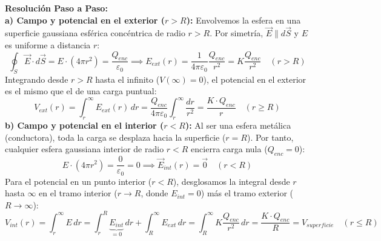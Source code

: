 \begin{ejercicio}
\begin{center}
\end{center}
\textbf{Resolución Paso a Paso:}\\[4pt]
\textbf{a) Campo y potencial en el exterior ($r > R$):}
Envolvemos la esfera en una superficie gaussiana esférica concéntrica de radio $r > R$. Por simetría, $\vec{E} \parallel d\vec{S}$ y $E$ es uniforme a distancia $r$:
\begin{equation}
    \oint_S \vec{E}\cdot d\vec{S} = E \cdot (4\pi r^2) = \frac{Q_{enc}}{\varepsilon_0} \implies \boxed{E_{ext}(r) = \frac{1}{4\pi\varepsilon_0} \frac{Q_{enc}}{r^2} = K \frac{Q_{enc}}{r^2}} \quad (r > R)
\end{equation}
Integrando desde $r > R$ hasta el infinito ($V(\infty)=0$), el potencial en el exterior es el mismo que el de una carga puntual:
\begin{equation}
    V_{ext}(r) = \int_r^\infty E_{ext}(r)\, dr = \frac{Q_{enc}}{4\pi\varepsilon_0} \int_r^\infty \frac{dr}{r^2} = \boxed{\frac{K \cdot Q_{enc}}{r}} \quad (r \ge R)
\end{equation}
\textbf{b) Campo y potencial en el interior ($r < R$):}
Al ser una esfera metálica (conductora), toda la carga se desplaza hacia la superficie ($r = R$). Por tanto, cualquier esfera gaussiana interior de radio $r < R$ encierra carga nula ($Q_{enc} = 0$):
\begin{equation}
    E \cdot (4\pi r^2) = \frac{0}{\varepsilon_0} = 0 \implies \boxed{\vec{E}_{int}(r) = \vec{0}} \quad (r < R)
\end{equation}
Para el potencial en un punto interior ($r < R$), desglosamos la integral desde $r$ hasta $\infty$ en el tramo interior ($r \to R$, donde $E_{int} = 0$) más el tramo exterior ($R \to \infty$):
\begin{equation}
    V_{int}(r) = \int_r^\infty E\, dr = \int_r^R \underbrace{E_{int}}_{=0}\, dr + \int_R^\infty E_{ext}\, dr = \int_R^\infty K \frac{Q_{enc}}{r^2}\, dr = \boxed{\frac{K \cdot Q_{enc}}{R} = V_{superficie}} \quad (r \le R)

\end{equation}
\end{ejercicio}
